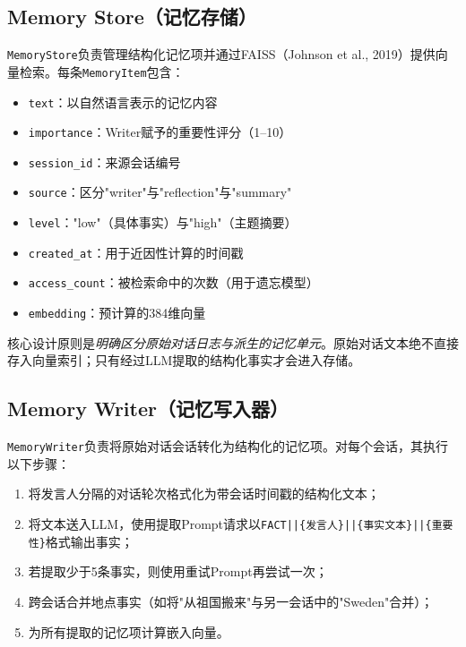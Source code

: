 \documentclass[11pt,a4paper]{ctexart}
\begin{document}
\subsection{Memory Store（记忆存储）}

\texttt{MemoryStore}负责管理结构化记忆项并通过FAISS（Johnson et al., 2019）提供向量检索。每条\texttt{MemoryItem}包含：

\begin{itemize}[nosep]
    \item \texttt{text}：以自然语言表示的记忆内容
    \item \texttt{importance}：Writer赋予的重要性评分（1--10）
    \item \texttt{session\_id}：来源会话编号
    \item \texttt{source}：区分"writer"与"reflection"与"summary"
    \item \texttt{level}："low"（具体事实）与"high"（主题摘要）
    \item \texttt{created\_at}：用于近因性计算的时间戳
    \item \texttt{access\_count}：被检索命中的次数（用于遗忘模型）
    \item \texttt{embedding}：预计算的384维向量
\end{itemize}

核心设计原则是\emph{明确区分原始对话日志与派生的记忆单元}。原始对话文本绝不直接存入向量索引；只有经过LLM提取的结构化事实才会进入存储。

\subsection{Memory Writer（记忆写入器）}

\texttt{MemoryWriter}负责将原始对话会话转化为结构化的记忆项。对每个会话，其执行以下步骤：

\begin{enumerate}[nosep]
    \item 将发言人分隔的对话轮次格式化为带会话时间戳的结构化文本；
    \item 将文本送入LLM，使用提取Prompt请求以\texttt{FACT||\{发言人\}||\{事实文本\}||\{重要性\}}格式输出事实；
    \item 若提取少于5条事实，则使用重试Prompt再尝试一次；
    \item 跨会话合并地点事实（如将"从祖国搬来"与另一会话中的"Sweden"合并）；
    \item 为所有提取的记忆项计算嵌入向量。
\end{enumerate}
\end{document}
